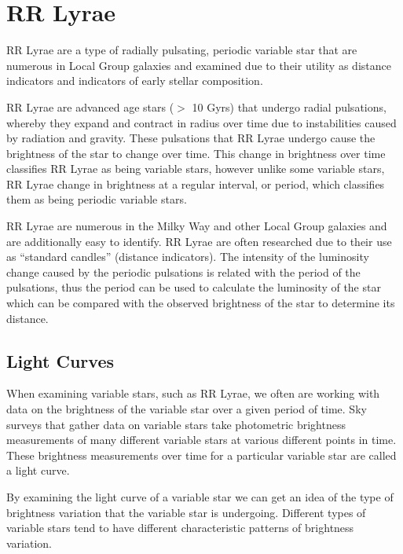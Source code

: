 \documentclass[]{article}
\begin{document}
\newpage

\section{RR Lyrae}

RR Lyrae are a type of radially pulsating, periodic variable star that are numerous in Local Group galaxies and examined due to their utility as distance indicators and indicators of early stellar composition. \cite{szczygiel_2009, kinemuchi_2006_a}

RR Lyrae are advanced age stars ($>$ 10 Gyrs) that undergo radial pulsations, whereby they expand and contract in radius over time due to instabilities caused by radiation and gravity. \cite{szczygiel_2009, templeton_2010} These pulsations that RR Lyrae undergo cause the brightness of the star to change over time. This change in brightness over time classifies RR Lyrae as being variable stars, however unlike some variable stars, RR Lyrae change in brightness at a regular interval, or period, which classifies them as being periodic variable stars. \cite{AAVSO_nodate}

RR Lyrae are numerous in the Milky Way and other Local Group galaxies and are additionally easy to identify. \cite{soszynski_2016, kinemuchi_2006} RR Lyrae are often researched due to their use as ``standard candles'' (distance indicators). \cite{soszynski_2016} The intensity of the luminosity change caused by the periodic pulsations is related with the period of the pulsations, thus the period can be used to calculate the luminosity of the star which can be compared with the observed brightness of the star to determine its distance. \cite{templeton_2010}

\subsection{Light Curves}

When examining variable stars, such as RR Lyrae, we often are working with data on the brightness of the variable star over a given period of time. Sky surveys that gather data on variable stars take photometric brightness measurements of many different variable stars at various different points in time. These brightness measurements over time for a particular variable star are called a light curve. \cite{AAVSO_nodate}

By examining the light curve of a variable star we can get an idea of the type of brightness variation that the variable star is undergoing. Different types of variable stars tend to have different characteristic patterns of brightness variation. \cite{sokolovsky_2017}
\end{document}
